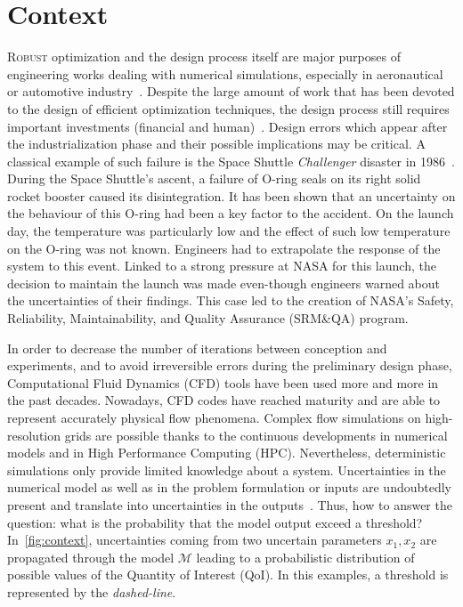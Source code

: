 \chapter{Context}

\lettrine{R}{obust} optimization and the design process itself are major purposes of engineering works dealing with numerical simulations, especially in aeronautical or automotive industry~\cite{duchaine2009}. Despite the large amount of work that has been devoted to the design of efficient optimization techniques, the design process still requires important investments (financial and human)~\cite{forrester2009}. Design errors which appear after the industrialization phase and their possible implications may be critical. A classical example of such failure is the Space Shuttle \emph{Challenger} disaster in 1986~\cite{draper1995}. During the Space Shuttle's ascent, a failure of O-ring seals on its right solid rocket booster caused its disintegration. It has been shown that an uncertainty on the behaviour of this O-ring had been a key factor to the accident. On the launch day, the temperature was particularly low and the effect of such low temperature on the O-ring was not known. Engineers had to extrapolate the response of the system to this event. Linked to a strong pressure at NASA for this launch, the decision to maintain the launch was made even-though engineers warned about the uncertainties of their findings. This case led to the creation of NASA's Safety, Reliability, Maintainability, and Quality Assurance (SRM\&QA) program.

In order to decrease the number of iterations between conception and experiments, and to avoid irreversible errors during the preliminary design phase, Computational Fluid Dynamics (CFD) tools have been used more and more in the past decades. Nowadays, CFD codes have reached maturity and are able to represent accurately physical flow phenomena. Complex flow simulations on high-resolution grids are possible thanks to the continuous developments in numerical models and in High Performance Computing (HPC). Nevertheless, deterministic simulations only provide limited knowledge about a system. Uncertainties in the numerical model as well as in the problem formulation or inputs are undoubtedly present and translate into uncertainties in the outputs~\cite{Sacks1989}. Thus, how to answer the question: what is the probability that the model output exceed a threshold? In~\cref{fig:context}, uncertainties coming from two uncertain parameters $x_1,x_2$ are propagated through the model $\mathcal{M}$ leading to a probabilistic distribution of possible values of the Quantity of Interest (QoI). In this examples, a threshold is represented by the \emph{dashed-line}.


